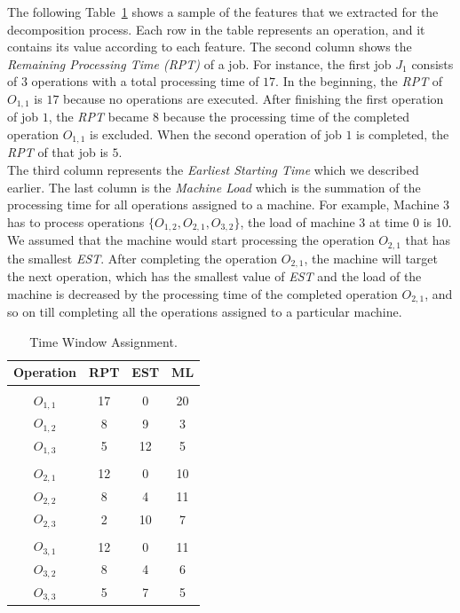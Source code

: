 \documentclass[runningheads]{llncs}
\begin{document}
The following Table~\ref{tab3} shows a sample of the features that we extracted for the decomposition process. Each row in the table represents an operation, and it contains its value according to each feature. The second column shows the \textit{Remaining Processing Time (RPT)} of a job. For instance, the first job $J_1$ consists of $3$ operations with a total processing time of $17$. In the beginning, the \textit{RPT} of $O_{1,1}$ is $17$ because no operations are executed. After finishing the first operation of job $1$, the \textit{RPT} became $8$ because the processing time of the completed operation $O_{1,1}$ is excluded. When the second operation of job $1$ is completed, the \textit{RPT} of that job is $5$. \\

The third column represents the \textit{Earliest Starting Time} which we described earlier. The last column is the \textit{Machine Load} which is the summation of the processing time for all operations assigned to a machine. For example, Machine $3$ has to process operations $\{ O_{1,2}, O_{2,1}, O_{3,2} \}$, the load of machine $3$ at time $0$ is 10. We assumed that the machine would start processing the operation $O_{2,1}$ that has the smallest \textit{EST}. After completing the operation $O_{2,1}$, the machine will target the next operation, which has the smallest value of \textit{EST} and the load of the machine is decreased by the processing time of the completed operation $O_{2,1}$, and so on till completing all the operations assigned to a particular machine.

\begin{table}[h!]
\fontsize{12}{9}
\setlength{\tabcolsep}{10.0pt}
\centering
  \begin{center}
  \caption{Time Window Assignment.}
  \label{tab3}
    \begin{tabular}{c  c  c  c}
      \textbf{Operation} & \textbf{RPT} & \textbf{EST} & \textbf{ML}\\
      \hline
										\\
      $O_{1,1}$  & 17 & 0   & 20	\\
      $O_{1,2}$  & 8  & 9   & 3		\\
      $O_{1,3}$  & 5  & 12 & 5		\\
										\\
      $O_{2,1}$  & 12 & 0   & 10	\\
      $O_{2,2}$  & 8  & 4   & 11	\\
      $O_{2,3}$  & 2  & 10 & 7		\\
					    					\\
      $O_{3,1}$  & 12 & 0  & 11	\\
      $O_{3,2}$  & 8  & 4  & 6		\\
      $O_{3,3}$  & 5  & 7  & 5		\\
    \end{tabular}

  \end{center} 
\end{table}
\end{document}
